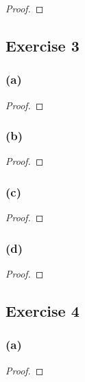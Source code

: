 \documentclass[14pt]{extarticle}
\begin{document}
\begin{proof}

\end{proof}

\subsection{Exercise 3}

\subsubsection{(a)}

\begin{proof}

\end{proof}

\subsubsection{(b)}

\begin{proof}

\end{proof}

\subsubsection{(c)}

\begin{proof}

\end{proof}

\subsubsection{(d)}

\begin{proof}

\end{proof}

\subsection{Exercise 4}

\subsubsection{(a)}

\begin{proof}

\end{proof}
\end{document}
